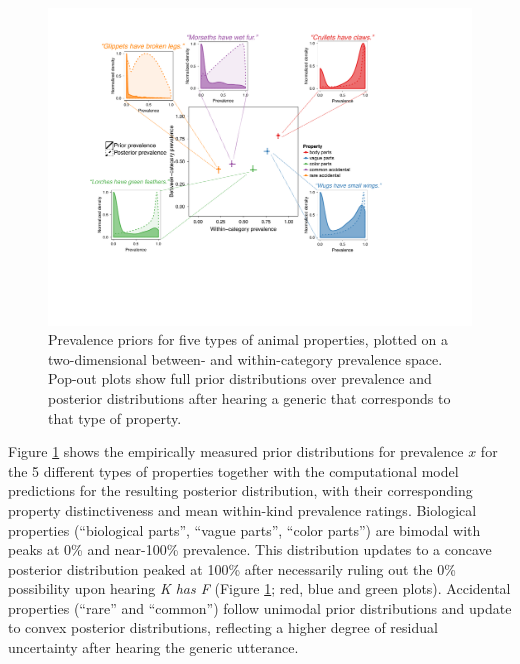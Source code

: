 \documentclass[10pt,letterpaper]{article}
\begin{document}
\begin{figure}
\centering
    \includegraphics[width=1\columnwidth]{prevalence-asymmetry-scatterwDists.pdf}
    \caption{Prevalence priors for five types of animal properties, plotted on a two-dimensional between- and within-category prevalence space. 
    Pop-out plots show full prior distributions over prevalence and posterior distributions after hearing a generic that corresponds to that type of property. }
  \label{fig:prior2}
\end{figure}


Figure \ref{fig:prior2} shows the empirically measured prior distributions for prevalence $x$ for the 5 different types of properties together with the computational model predictions for the resulting posterior distribution, with their corresponding property distinctiveness and mean within-kind prevalence ratings. 
Biological properties (``biological parts'', ``vague parts'', ``color parts'') are bimodal with peaks at 0\% and near-100\% prevalence. 
This distribution updates to a concave posterior distribution peaked at 100\% after necessarily ruling out the 0\% possibility upon hearing \emph{K has F} (Figure \ref{fig:prior2}; red, blue and green plots). 
Accidental properties (``rare'' and ``common'') follow unimodal prior distributions and update to convex posterior distributions, reflecting a higher degree of residual uncertainty after hearing the generic utterance. 
\end{document}
